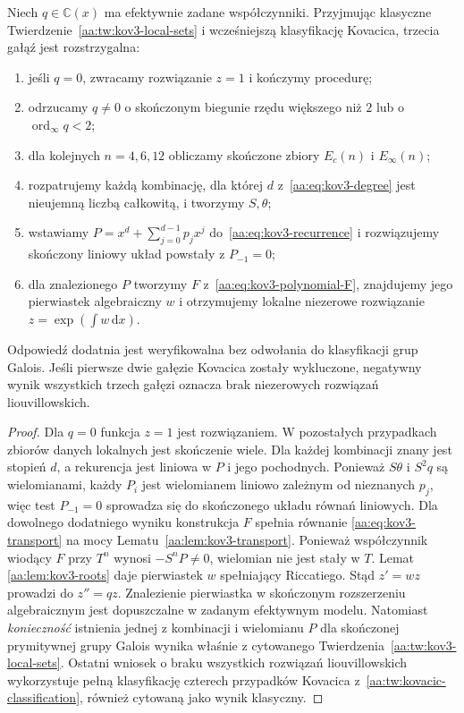 \begin{twierdzenie}
\label{aa:tw:kov3-algorithm}
Niech $q\in\mathbb C(x)$
ma efektywnie zadane
współczynniki.
Przyjmując klasyczne
Twierdzenie~\ref{aa:tw:kov3-local-sets}
i wcześniejszą klasyfikację
Kovacica, trzecia gałąź
jest rozstrzygalna:
\begin{enumerate}
\item jeśli $q=0$, zwracamy rozwiązanie $z=1$
i kończymy procedurę;
\item odrzucamy $q\ne0$
o skończonym biegunie
rzędu większego niż $2$
lub o
$\operatorname{ord}_{\infty}q<2$;
\item dla kolejnych
$n=4,6,12$ obliczamy
skończone zbiory
$E_c(n)$ i $E_\infty(n)$;
\item rozpatrujemy każdą
kombinację, dla której
$d$ z~\eqref{aa:eq:kov3-degree}
jest nieujemną liczbą
całkowitą, i tworzymy
$S,\theta$;
\item wstawiamy
$P=x^d+\sum_{j=0}^{d-1}p_jx^j$
do~\eqref{aa:eq:kov3-recurrence}
i rozwiązujemy
skończony liniowy układ
powstały z $P_{-1}=0$;
\item dla znalezionego
$P$ tworzymy $F$
z~\eqref{aa:eq:kov3-polynomial-F},
znajdujemy jego
pierwiastek algebraiczny
$w$ i otrzymujemy
lokalne niezerowe rozwiązanie
$z=\exp(\int w\,\mathrm dx)$.
\end{enumerate}
Odpowiedź dodatnia jest
weryfikowalna bez odwołania
do klasyfikacji grup Galois.
Jeśli pierwsze dwie gałęzie
Kovacica zostały wykluczone,
negatywny wynik wszystkich
trzech gałęzi oznacza brak
niezerowych rozwiązań
liouvillowskich.
\end{twierdzenie}
\begin{proof}
Dla $q=0$ funkcja $z=1$ jest rozwiązaniem.
W pozostałych przypadkach zbiorów danych
lokalnych jest skończenie wiele.
Dla każdej kombinacji
znany jest stopień $d$,
a rekurencja jest liniowa
w $P$ i jego pochodnych.
Ponieważ $S\theta$ i
$S^2q$ są wielomianami,
każdy $P_i$ jest
wielomianem liniowo
zależnym od nieznanych
$p_j$, więc test
$P_{-1}=0$ sprowadza się
do skończonego układu
równań liniowych.
Dla dowolnego dodatniego
wyniku konstrukcja $F$
spełnia równanie
\eqref{aa:eq:kov3-transport}
na mocy
Lematu~\ref{aa:lem:kov3-transport}.
Ponieważ współczynnik
wiodący $F$ przy $T^n$
wynosi $-S^nP\ne0$,
wielomian nie jest stały
w $T$. Lemat
\ref{aa:lem:kov3-roots}
daje pierwiastek
$w$ spełniający Riccatiego.
Stąd $z' = wz$ prowadzi do
$z''=qz$.
Znalezienie pierwiastka
w skończonym rozszerzeniu
algebraicznym jest
dopuszczalne w zadanym
efektywnym modelu.
Natomiast \emph{konieczność}
istnienia jednej z
kombinacji i wielomianu $P$
dla skończonej prymitywnej
grupy Galois wynika
właśnie z cytowanego
Twierdzenia~\ref{aa:tw:kov3-local-sets}.
Ostatni wniosek o braku
wszystkich rozwiązań
liouvillowskich wykorzystuje
pełną klasyfikację czterech
przypadków Kovacica
z~\ref{aa:tw:kovacic-classification},
również cytowaną
jako wynik klasyczny.
\end{proof}

